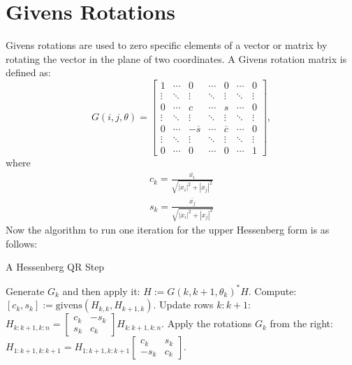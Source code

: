 \section{Givens Rotations}
Givens rotations are used to zero specific elements of a vector or matrix by rotating the vector in the plane of two coordinates. A Givens rotation matrix is defined as:
\[
G(i, j, \theta) =
\begin{bmatrix}
1 & \cdots & 0 & \cdots & 0 & \cdots & 0 \\
\vdots & \ddots & \vdots & \ddots & \vdots & \ddots & \vdots \\
0 & \cdots & c & \cdots & s & \cdots & 0 \\
\vdots & \ddots & \vdots & \ddots & \vdots & \ddots & \vdots \\
0 & \cdots & -\overline{s} & \cdots & \overline{c} & \cdots & 0 \\
\vdots & \ddots & \vdots & \ddots & \vdots & \ddots & \vdots \\
0 & \cdots & 0 & \cdots & 0 & \cdots & 1
\end{bmatrix},
\]
where 
\begin{align}
    c_k = \frac{\overline{x_i}}{\sqrt{|x_i|^2 + |x_j|^2}}\\
    s_k = \frac{\overline{x_j}}{\sqrt{|x_i|^2 + |x_j|^2}}   
\end{align}
Now the algorithm to run one iteration for the upper Hessenberg form is as follows:
\begin{algorithm}
\caption{A Hessenberg QR Step}
\begin{algorithmic}[1]
    \STATE Generate \(G_k\) and then apply it: \(H := G(k, k+1, \theta_k)^* H\).
    \STATE Compute: \([c_k, s_k] := \text{givens}(H_{k,k}, H_{k+1,k})\).
    \STATE Update rows \(k:k+1\): \(H_{k:k+1,k:n} = \begin{bmatrix} c_k & -s_k \\ s_k & c_k \end{bmatrix} H_{k:k+1,k:n}\).
\ENDFOR
{}
    \STATE Apply the rotations \(G_k\) from the right:
    \STATE \(H_{1:k+1,k:k+1} = H_{1:k+1,k:k+1} \begin{bmatrix} c_k & s_k \\ -s_k & c_k \end{bmatrix}\).
\ENDFOR
\end{algorithmic}
\end{algorithm}

